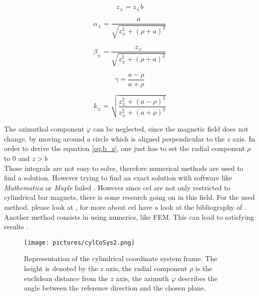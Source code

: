 \begin{equation}
z_{\pm} = z_{\pm} b
\end{equation}

\begin{equation}
\alpha_{\pm} = \frac{a}{\sqrt{z_{\pm}^2+(\rho+a)^2}}
\end{equation}

\begin{equation}
\beta_{\pm} = \frac{z_{\pm}}{\sqrt{z_{\pm}^2+(\rho+a)^2}}
\end{equation}

\begin{equation}
\gamma = \frac{a-\rho}{a+\rho}
\end{equation}

\begin{equation}
k_{\pm} = \sqrt{\frac{z_{\pm}^2 + (a-\rho)^2}{z_{\pm}^2 + (a+\rho)^2}}
\end{equation}

The azimuthal component $ \varphi $ can be neglected, since the magnetic field does not change, by moving around a circle which is aligned perpendicular to the $ z $ axis. In order to derive the equation \ref{eq:b_z}, one just has to set the radial component $ \rho $ to 0 and $ z > b $\\
Those integrals are not easy to solve, therefore numerical methods are used to find a solution. However trying to find an exact solution with software like \textit{Mathematica} or \textit{Maple} failed \cite{camacho2013alternative}. However since \ac{cel} are not only restricted to cylindrical bar magnets, there is some research going on in this field. For the used method, please look at , for more about \ac{cel} have a look at the bibliography of \cite{derby2010cylindrical}. Another method consists in using numerics, like \ac{FEM}. This can lead to satisfying results \cite{mladenovic2009magnetic}.

\begin{figure}
\centering
\texttt{[image: pictures/cylCoSys2.png]}
\label{fig:cylCoSys}
\caption{Representation of the cylindrical coordinate system frame. The height is denoted by the $ z $ axis, the radial component $ \rho $ is the euclidean distance from the $ z $ axis, the azimuth $ \varphi $ describes the angle between the reference direction and the chosen plane.}
\end{figure}


